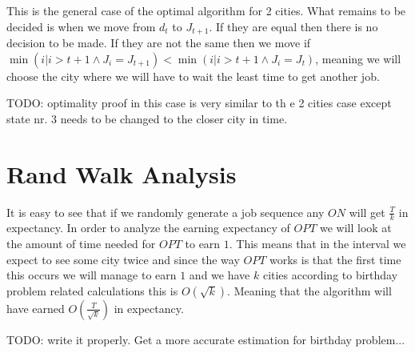 \documentclass[]{article}
\begin{document}
This is the general case of the optimal algorithm for 2 cities. What remains to be decided is when we move from $ d_t $ to $ J_{t+1} $. If they are equal then there is no decision to be made. If they are not the same then we move if $ \min({i | i > t + 1 \land J_{i} = J_{t+1}}) < \min({i | i > t + 1 \land J_{i} = J_{t}}) $, meaning we will choose the city where we will have to wait the least time to get another job.

TODO: optimality proof in this case is very similar to th e 2 cities case except state nr. 3 needs to be changed to the closer city in time.

\section{Rand Walk Analysis}

It is easy to see that if we randomly generate a job sequence any $ ON $ will get $ \frac{T}{k} $ in expectancy.
In order to analyze the earning expectancy of $ OPT $ we will look at the amount of time needed for $ OPT $ to
earn $ 1 $. This means that in the interval we expect to see some city twice and since the way $ OPT $ works is
that the first time this occurs we will manage to earn $ 1 $ and we have $ k $ cities according to birthday
problem related calculations this is $ O(\sqrt{k}) $. Meaning that the algorithm will have earned $ O(\frac{T}{\sqrt{k}}) $ in expectancy.

TODO: write it properly. Get a more accurate estimation for birthday problem...
\end{document}
